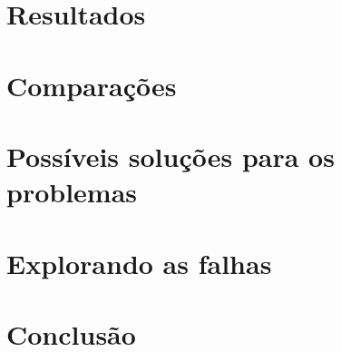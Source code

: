 \documentclass[
	12pt,				%
	openright,			%
	twoside,			%
	a4paper,			%
	english,			%
	french,				%
	spanish,			%
	brazil				%
	]{abntex2}
\begin{document}
\chapter{Resultados}

\chapter{Comparações}

\chapter{Possíveis soluções para os problemas}

\chapter{Explorando as falhas}


\chapter{Conclusão}

\postextual




\printindex
\end{document}
